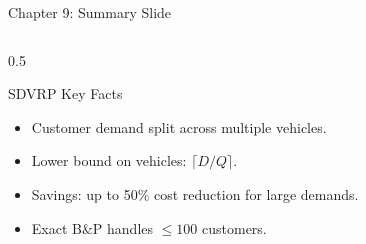 \documentclass[aspectratio=169,10pt]{beamer}
\begin{document}
\begin{frame}[allowframebreaks]{Chapter 9: Summary Slide}
\begin{columns}[T]
\begin{column}{0.5\textwidth}
    \begin{block}{SDVRP Key Facts}
      \begin{itemize}\small
        \item Customer demand split across multiple vehicles.
        \item Lower bound on vehicles: $\lceil D/Q \rceil$.
        \item Savings: up to 50\% cost reduction for large demands.
        \item Exact B\&P handles $\leq100$ customers.
      \end{itemize}
    \end{block}
  \end{column}
\end{columns}

\end{frame}
\end{document}
